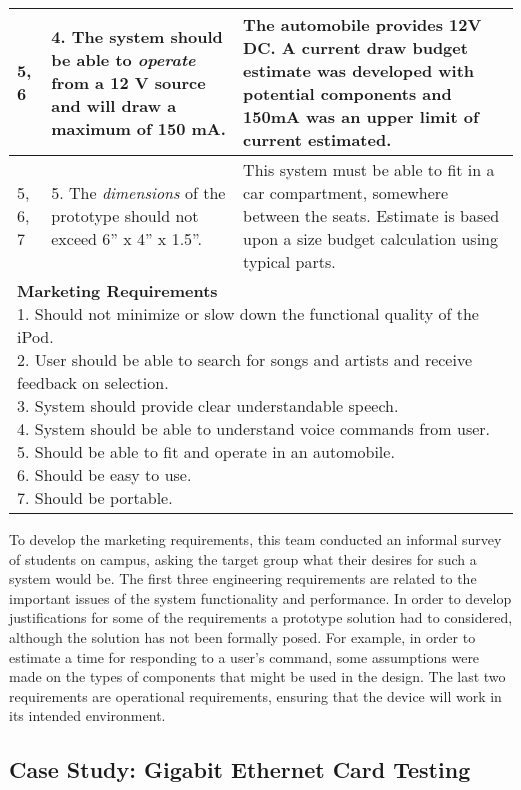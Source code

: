 \begin{longtable}{ |p{2.5cm}|p{5cm}|p{5cm}|}
5, 6 & 
4.   The system should be able to \emph{operate} from a 12 V source and
  will draw a maximum of 150 mA. &
The automobile provides 12V DC. A current draw budget
estimate was developed with potential components and 150mA was an upper
limit of current estimated. \\ \hline

5, 6, 7 & 
5.  The \emph{dimensions} of the prototype should not exceed 6'' x 4'' x  1.5''. &
This system must be able to fit in a car compartment,
somewhere between the seats. Estimate is based upon a size budget
calculation using typical parts. \\ \hline

\multicolumn{3}{|p{12cm}|}{
\textbf{Marketing Requirements}\newline
1. Should not minimize or slow down the functional quality of the iPod.\newline
2.  User should be able to search for songs and artists and receive feedback on selection.\newline
3.  System should provide clear understandable speech.\newline
4.  System should be able to understand voice commands from user.\newline
5.  Should be able to fit and operate in an automobile.\newline
6.  Should be easy to use.\newline
7.  Should be portable.
} \\ \hline
\end{longtable}

To develop the marketing requirements, this team conducted an informal
survey of students on campus, asking the target group what their desires
for such a system would be. The first three engineering requirements are
related to the important issues of the system functionality and
performance. In order to develop justifications for some of the
requirements a prototype solution had to considered, although the
solution has not been formally posed. For example, in order to estimate
a time for responding to a user's command, some assumptions were made on
the types of components that might be used in the design. The last two
requirements are operational requirements, ensuring that the device will
work in its intended environment.

\subsection{Case Study: Gigabit Ethernet Card Testing}
\label{subsection:case-study-gigabit-ethernet-card-testing}

